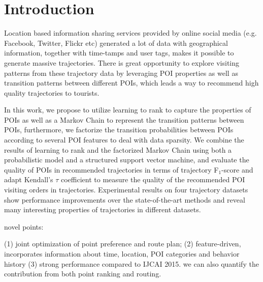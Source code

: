 \section{Introduction}
\label{sec:introduction}
Location based information sharing services provided by online social media 
(e.g. Facebook, Twitter, Flickr etc) generated a lot of data with geographical information, 
together with time-tamps and user tags, makes it possible to generate massive trajectories.
There is great opportunity to explore visiting patterns from these trajectory data by leveraging POI properties 
as well as transition patterns between different POIs, which leads a way to recommend high quality trajectories to tourists.

In this work, we propose to utilize learning to rank to capture the properties of POIs as well as a Markov Chain to 
represent the transition patterns between POIs, furthermore, we factorize the transition probabilities between POIs
according to several POI features to deal with data sparsity.
We combine the results of learning to rank and the factorized Markov Chain using both a probabilistic model and a structured
support vector machine, and evaluate the quality of POIs in recommended trajectories in terms of trajectory F$_1$-score\cite{ijcai15} and 
adapt Kendall's $\tau$ coefficient\cite{kendalltau} to measure the quality of the recommended POI visiting orders in trajectories.
Experimental results on four trajectory datasets show performance improvements over the state-of-the-art methods and 
reveal many interesting properties of trajectories in different datasets.


novel points:

(1) joint optimization of point preference and route plan;
(2) feature-driven, incorporates information about time, location, POI categories and behavior history
(3) strong performance compared to IJCAI 2015. we can also quantify the contribution from both point ranking and routing. 